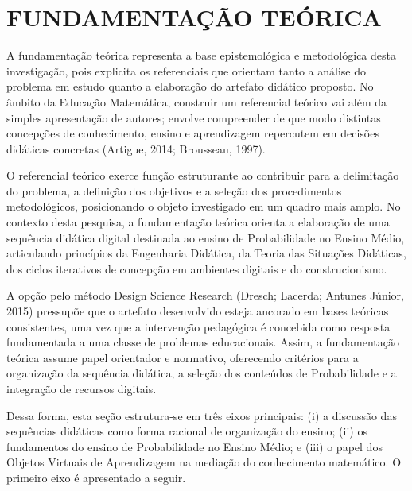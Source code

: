 
\chapter{FUNDAMENTAÇÃO TEÓRICA}

{\color{blue} A fundamentação teórica representa a base epistemológica e metodológica desta investigação, pois explicita os referenciais que orientam tanto a análise do problema em estudo quanto a elaboração do artefato didático proposto. No âmbito da Educação Matemática, construir um referencial teórico vai além da simples apresentação de autores; envolve compreender de que modo distintas concepções de conhecimento, ensino e aprendizagem repercutem em decisões didáticas concretas (Artigue, 2014; Brousseau, 1997).

O referencial teórico exerce função estruturante ao contribuir para a delimitação do problema, a definição dos objetivos e a seleção dos procedimentos metodológicos, posicionando o objeto investigado em um quadro mais amplo. No contexto desta pesquisa, a fundamentação teórica orienta a elaboração de uma sequência didática digital destinada ao ensino de Probabilidade no Ensino Médio, articulando princípios da Engenharia Didática, da Teoria das Situações Didáticas, dos ciclos iterativos de concepção em ambientes digitais e do construcionismo.

A opção pelo método Design Science Research (Dresch; Lacerda; Antunes Júnior, 2015) pressupõe que o artefato desenvolvido esteja ancorado em bases teóricas consistentes, uma vez que a intervenção pedagógica é concebida como resposta fundamentada a uma classe de problemas educacionais. Assim, a fundamentação teórica assume papel orientador e normativo, oferecendo critérios para a organização da sequência didática, a seleção dos conteúdos de Probabilidade e a integração de recursos digitais.

Dessa forma, esta seção estrutura-se em três eixos principais: (i) a discussão das sequências didáticas como forma racional de organização do ensino; (ii) os fundamentos do ensino de Probabilidade no Ensino Médio; e (iii) o papel dos Objetos Virtuais de Aprendizagem na mediação do conhecimento matemático. O primeiro eixo é apresentado a seguir.}

